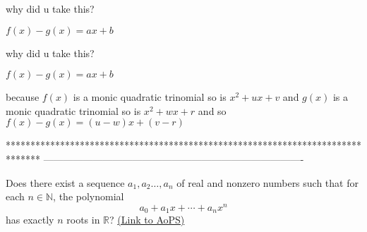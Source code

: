 \begin{solution}
	why did u take this?

\begin{tcolorbox}$ f(x)-g(x) = ax+b$\end{tcolorbox}
\end{solution}



\begin{solution}
	\begin{tcolorbox}why did u take this?

\begin{tcolorbox}$ f(x) - g(x) = ax + b$\end{tcolorbox}\end{tcolorbox}

because $ f(x)$ is a monic quadratic trinomial so is $ x^2+ux+v$ and $ g(x)$ is a monic quadratic trinomial so is $ x^2+wx+r$ and so $ f(x)-g(x)=(u-w)x+(v-r)$
\end{solution}
*******************************************************************************
-------------------------------------------------------------------------------

\begin{problem}
	Does there exist a sequence $ a_{1},a_{2}\ldots ,a_{n}$ of real and nonzero numbers such that for each $n\in\mathbb{N}$, the polynomial \[ a_{0}+a_{1}x+\cdots +a_{n}x^{n}\] has exactly $ n$ roots in $\mathbb R$?
	\flushright \href{https://artofproblemsolving.com/community/c6h341024}{(Link to AoPS)}
\end{problem}



